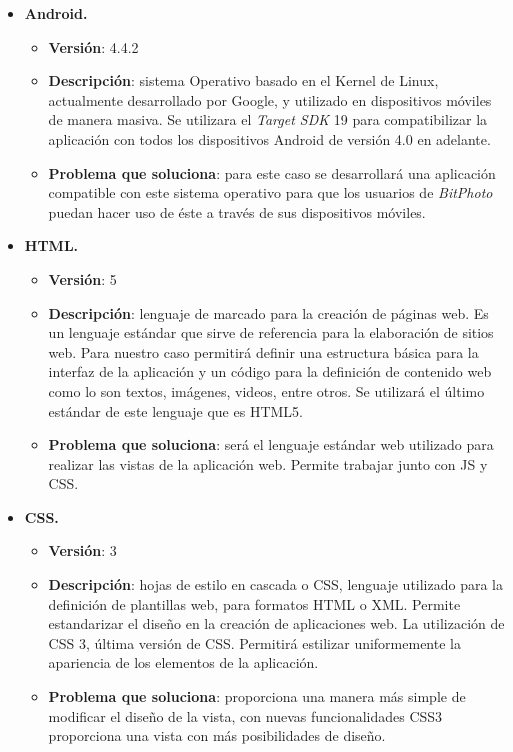 \documentclass{memoria}
\begin{document}
\begin{itemize}
\item \textbf{Android.}
	\begin{itemize}
	\item \textbf{Versión}: 4.4.2  
	\item \textbf{Descripción}: sistema Operativo basado en el Kernel de Linux, actualmente desarrollado por Google, y utilizado en dispositivos móviles de manera masiva. Se utilizara el \textsl{Target SDK} 19 para compatibilizar la aplicación con todos los dispositivos Android de versión 4.0 en adelante.
	\item \textbf{Problema que soluciona}: para este caso se desarrollará una aplicación compatible con este sistema operativo para que los usuarios de \textsl{BitPhoto} puedan hacer uso de éste a través de sus dispositivos móviles.
	\end{itemize}
	
\item \textbf{HTML.}
	\begin{itemize}
	\item \textbf{Versión}: 5  
	\item \textbf{Descripción}: lenguaje de marcado para la creación de páginas web. Es un lenguaje estándar que sirve de referencia para la elaboración de sitios web. Para nuestro caso permitirá definir una estructura básica para la interfaz de la aplicación y un código para la definición de contenido web como lo son textos, imágenes, videos, entre otros. Se utilizará el último estándar de este lenguaje que es HTML5.
	\item \textbf{Problema que soluciona}: será el lenguaje estándar web utilizado para realizar las vistas de la aplicación web. Permite trabajar junto con JS y CSS.
	\end{itemize}
	
\item \textbf{CSS.}
	\begin{itemize}
	\item \textbf{Versión}: 3  
	\item \textbf{Descripción}: hojas de estilo en cascada o CSS, lenguaje utilizado para la definición de plantillas web, para formatos HTML o XML. Permite estandarizar el diseño en la creación de aplicaciones web. La utilización de CSS 3, última versión de CSS. Permitirá estilizar uniformemente la apariencia de los elementos de la aplicación. 
	\item \textbf{Problema que soluciona}: proporciona una manera más simple de modificar el diseño de la vista, con nuevas funcionalidades CSS3 proporciona una vista con más posibilidades de diseño.
	\end{itemize}
	

\end{itemize}
\end{document}
